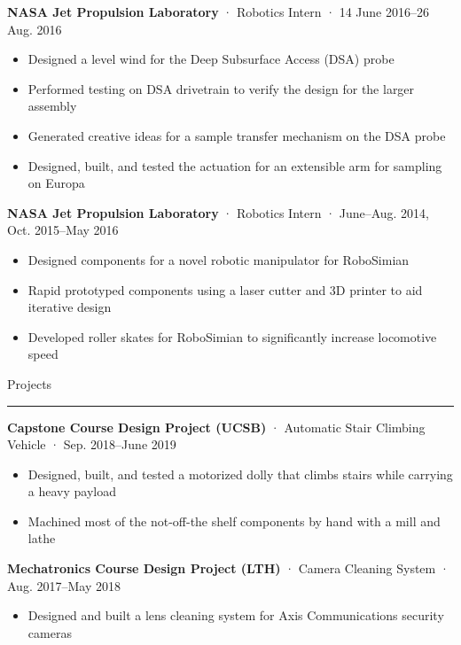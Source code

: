 \documentclass[12pt, oneside]{article}
\newcommand{\headingstyleJobs}[1] {
	{\fontsize{19pt}{1em}\selectfont \textcolor{new_red}{\textsf{#1}}}
	\textcolor{new_red}{\rule{3.25in}{0.5pt}} \vspace{3pt}
}
\newcommand{\jobtitle}[3] {
	{\bf #1} · {#2} · {#3} \vspace{-10pt} \\
}
\begin{document}
\begin{flushleft}
\jobtitle{NASA Jet Propulsion Laboratory}{Robotics Intern}{14 June 2016–26 Aug. 2016}
\def\HrefFont{\em}
\begin{itemize}
	\item Designed a level wind for the Deep Subsurface Access (DSA) probe \\
	\item Performed testing on DSA drivetrain to verify the design for the larger assembly \\
	\item Generated creative ideas for a sample transfer mechanism on the DSA probe \\
	\item Designed, built, and tested the actuation for an extensible arm for sampling on Europa
\end{itemize}

\jobtitle{NASA Jet Propulsion Laboratory}{Robotics Intern}{June–Aug. 2014, Oct. 2015–May 2016}
\begin{itemize}
	\item Designed components for a novel robotic manipulator for RoboSimian \\
	\item Rapid prototyped components using a laser cutter and 3D printer to aid iterative design \\
	\item Developed roller skates for RoboSimian to significantly increase locomotive speed
\end{itemize}


\headingstyleJobs{Projects}

\jobtitle{Capstone Course Design Project (UCSB)}{Automatic Stair Climbing Vehicle}{Sep. 2018–June 2019}
\begin{itemize}
	\item Designed, built, and tested a motorized dolly that climbs stairs while carrying a heavy payload \\
	\item Machined most of the not-off-the shelf components by hand with a mill and lathe
\end{itemize}

\jobtitle{Mechatronics Course Design Project (LTH)}{Camera Cleaning System}{Aug. 2017–May 2018}
\begin{itemize}
	\item Designed and built a lens cleaning system for Axis Communications security cameras
\end{itemize}


\end{flushleft}
\end{document}
